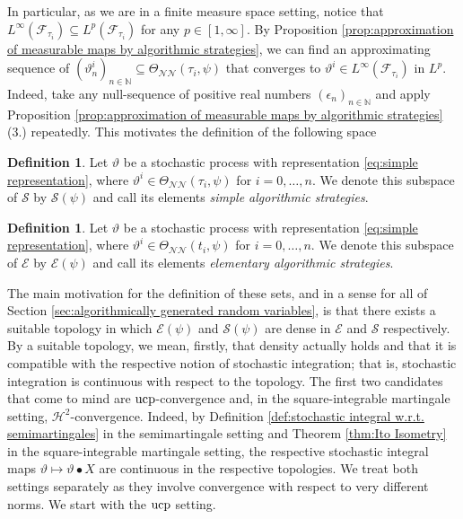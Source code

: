 \documentclass[11pt,a4paper,twoside,openany]{report}
\numberwithin{equation}{section}
\theoremstyle{plain} %
\theoremstyle{definition} %
\newtheorem{definition}[theorem]{Definition}
\theoremstyle{remark} %
\begin{document}
In particular, as we are in a finite measure space setting, notice that \(L^{\infty}(\mathcal{F}_{\tau_i})\subseteq L^{p}(\mathcal{F}_{\tau_i})\) for any \(p\in[1,\infty]\). By Proposition \ref{prop:approximation of measurable maps by algorithmic strategies}, we can find an approximating sequence of \((\vartheta^i_n)_{n\in\mathbb{N}}\subseteq\Theta_{\mathcal{NN}}(\tau_i,\psi)\) that converges to \(\vartheta^i\in L^{\infty}(\mathcal{F}_{\tau_i})\) in \(L^p\). Indeed, take any null-sequence of positive real numbers \((\epsilon_n)_{n\in\mathbb{N}}\) and apply Proposition \ref{prop:approximation of measurable maps by algorithmic strategies} (3.) repeatedly. This motivates the definition of the following space
\begin{definition}
    Let \(\vartheta\) be a stochastic process with representation \eqref{eq:simple representation}, where \(\vartheta^i\in\Theta_{\mathcal{NN}}(\tau_i,\psi)\) for \(i=0,\dots,n\). We denote this subspace of \(\mathcal{S}\) by \(\mathcal{S}(\psi)\) and call its elements \textit{simple algorithmic strategies}.
\end{definition}
\begin{definition}
    Let \(\vartheta\) be a stochastic process with representation \eqref{eq:simple representation}, where \(\vartheta^i\in\Theta_{\mathcal{NN}}(t_i,\psi)\) for \(i=0,\dots,n\). We denote this subspace of \(\mathcal{E}\) by \(\mathcal{E}(\psi)\) and call its elements \textit{elementary algorithmic strategies}.
\end{definition}
The main motivation for the definition of these sets, and in a sense for all of Section \ref{sec:algorithmically generated random variables}, is that there exists a suitable topology in which \(\mathcal{E}(\psi)\) and \(\mathcal{S}(\psi)\) are dense in \(\mathcal{E}\) and \(\mathcal{S}\) respectively. By a suitable topology, we mean, firstly, that density actually holds and that it is compatible with the respective notion of stochastic integration; that is, stochastic integration is continuous with respect to the topology. The first two candidates that come to mind are \(\rm{ucp}\)-convergence and, in the square-integrable martingale setting, \(\mathcal{H}^2\)-convergence. Indeed, by Definition \ref{def:stochastic integral w.r.t. semimartingales} in the semimartingale setting and Theorem \ref{thm:Ito Isometry} in the square-integrable martingale setting, the respective stochastic integral maps \(\vartheta\mapsto \vartheta\bullet X\) are continuous in the respective topologies. We treat both settings separately as they involve convergence with respect to very different norms. We start with the \(\rm{ucp}\) setting. 
\end{document}
